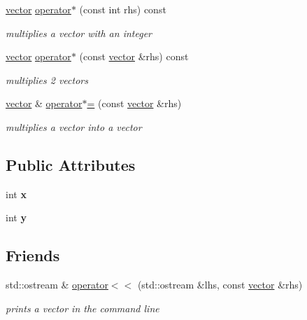 \begin{DoxyCompactItemize}
\hyperlink{classvector}{vector} \hyperlink{classvector_ad4e924ee21af1367f8724b2d94db110e}{operator$\ast$} (const int rhs) const
\begin{DoxyCompactList}\small\item\em multiplies a vector with an integer \end{DoxyCompactList}\item 
\hyperlink{classvector}{vector} \hyperlink{classvector_a9ef97fde561d0998f1db1af7c9fbbff8}{operator$\ast$} (const \hyperlink{classvector}{vector} \&rhs) const
\begin{DoxyCompactList}\small\item\em multiplies 2 vectors \end{DoxyCompactList}\item 
\hyperlink{classvector}{vector} \& \hyperlink{classvector_ad7dba928c0f8e3bef217dd1d97ebfb8f}{operator$\ast$=} (const \hyperlink{classvector}{vector} \&rhs)
\begin{DoxyCompactList}\small\item\em multiplies a vector into a vector \end{DoxyCompactList}\end{DoxyCompactItemize}
\subsection*{Public Attributes}
\begin{DoxyCompactItemize}
\item 
\mbox{\label{classvector_a0403eb3aea23a3009e276fba1d317046}} 
int {\bfseries x}
\item 
\mbox{\label{classvector_aad6de640298eae97ca0a094db5aff477}} 
int {\bfseries y}
\end{DoxyCompactItemize}
\subsection*{Friends}
\begin{DoxyCompactItemize}
\item 
std\+::ostream \& \hyperlink{classvector_a7a6813f75dabd6f9575f9d6f91890255}{operator$<$$<$} (std\+::ostream \&lhs, const \hyperlink{classvector}{vector} \&rhs)
\begin{DoxyCompactList}\small\item\em prints a vector in the command line \end{DoxyCompactList}\end{DoxyCompactItemize}


